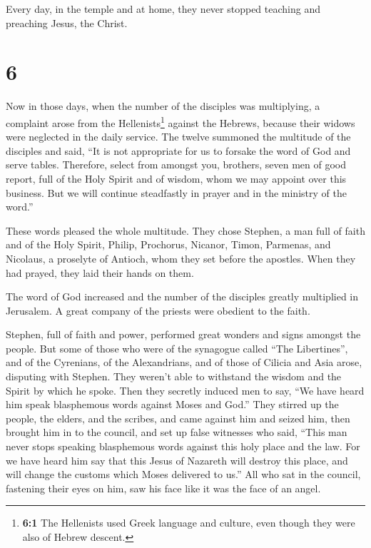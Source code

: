  Every day, in the temple and at home, they never stopped
teaching and preaching Jesus, the Christ.

\hypertarget{section-5}{%
\section{6}\label{section-5}}

 Now in those days, when the number of the disciples was
multiplying, a complaint arose from the Hellenists\footnote{\textbf{6:1}
  The Hellenists used Greek language and culture, even though they were
  also of Hebrew descent.} against the Hebrews, because their widows
were neglected in the daily service.  The twelve summoned
the multitude of the disciples and said, ``It is not appropriate for us
to forsake the word of God and serve tables.  Therefore,
select from amongst you, brothers, seven men of good report, full of the
Holy Spirit and of wisdom, whom we may appoint over this business.
 But we will continue steadfastly in prayer and in the
ministry of the word.''

 These words pleased the whole multitude. They chose
Stephen, a man full of faith and of the Holy Spirit, Philip, Prochorus,
Nicanor, Timon, Parmenas, and Nicolaus, a proselyte of Antioch,
 whom they set before the apostles. When they had prayed,
they laid their hands on them.

 The word of God increased and the number of the disciples
greatly multiplied in Jerusalem. A great company of the priests were
obedient to the faith.

 Stephen, full of faith and power, performed great wonders
and signs amongst the people.  But some of those who were
of the synagogue called ``The Libertines'', and of the Cyrenians, of the
Alexandrians, and of those of Cilicia and Asia arose, disputing with
Stephen.  They weren't able to withstand the wisdom and
the Spirit by which he spoke.  Then they secretly induced
men to say, ``We have heard him speak blasphemous words against Moses
and God.''  They stirred up the people, the elders, and
the scribes, and came against him and seized him, then brought him in to
the council,  and set up false witnesses who said, ``This
man never stops speaking blasphemous words against this holy place and
the law.  For we have heard him say that this Jesus of
Nazareth will destroy this place, and will change the customs which
Moses delivered to us.''  All who sat in the council,
fastening their eyes on him, saw his face like it was the face of an
angel.

